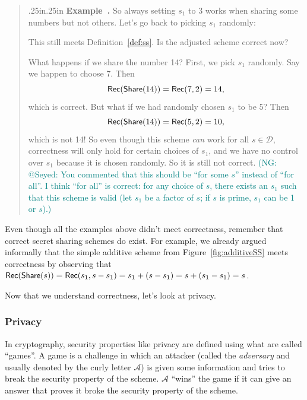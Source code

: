 \documentclass[12 pt]{article}
\newcommand{\sample}{\hskip2.3pt{\gets\!\!\mbox{\tiny${\$}$\normalsize}}\,}
\def\D{\ensuremath{\mathcal{D}}}
\def\A{\ensuremath{\mathcal{A}}}
\newcommand{\nsm}[1]{\textcolor{teal}{(NG: #1)}}
\newcounter{example}[section]
\newenvironment{example}{\refstepcounter{example}\par\bigskip \begin{quotation}{}{\leftmargin .25in\rightmargin .25in}
    \noindent \textbf{Example~\thesection.\theexample }  \rmfamily}{\end{quotation}\par\bigskip}
\begin{document}
\begin{example}\label{ex:floor}
    So always setting $s_1$ to 3 works when sharing some numbers but not 
    others. Let's go back to picking $s_1$ randomly:
    \begin{pchstack}[center]
    \procedure{$\share(s)$}{%
        s_1 \sample \{1, \ldots, 2^\lambda\} \\
        \pcreturn (s_1, \lfloor s/s_1 \rfloor)
    }
    \pchspace
    \end{pchstack}
    This still meets Definition~\ref{def:ss}. Is the adjusted scheme correct
    now?

    What happens if we share the number 14? First, we pick $s_1$ randomly.
    Say we happen to choose 7. Then 
    \[
        \mathsf{Rec}(\mathsf{Share}(14)) = \mathsf{Rec}(7, 2) = 14,
    \]
    which is correct. But what if we had randomly chosen $s_1$ to be 
    5? Then 
    \[
        \mathsf{Rec}(\mathsf{Share}(14)) = \mathsf{Rec}(5, 2) = 10,
    \]
    which is not 14!
    So even though this scheme \emph{can} work for all $s \in \D$, correctness 
    will only hold for certain choices of $s_1$, and we have no control over 
    $s_1$ because it is chosen randomly. So it is still not correct. 
    \nsm{@Seyed: You commented that this should be ``for some $s$''
    instead of ``for all''. I think ``for all'' is correct: for any choice 
    of $s$, there exists an $s_1$ such that this scheme is valid (let $s_1$ 
    be a factor of $s$; if $s$ is prime, $s_1$ can be 1 or $s$).}
\end{example}

Even though all the examples above didn't meet correctness, remember that
correct secret sharing schemes do exist. For example, we already argued informally that 
the simple additive scheme from Figure~\ref{fig:additiveSS} meets correctness
by observing that $\mathsf{Rec}(\mathsf{Share}(s)) = \mathsf{Rec}(s_1, s-s_1) = s_1 + 
(s-s_1) = s + (s_1-s_1) = s$.

Now that we understand correctness, let's look at privacy.

\subsubsection{Privacy}

In cryptography, security properties like privacy are defined using what 
are called ``games''. A game is a challenge in which an attacker (called 
the \emph{adversary} and usually denoted by the curly letter $\mathcal{A}$) is given 
some information and tries to break the security property of the scheme. 
$\A$ ``wins'' the game if it can give an answer that proves it broke 
the security property of the scheme. 
\end{document}
